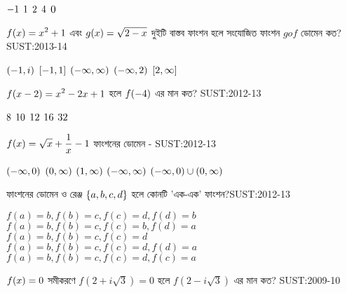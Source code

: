 \documentclass[addpoints]{exam}
\begin{document}
\begin{questions}
\begin{oneparchoices}
 \choice $\mathlarger{-1 }$
 \choice $\mathlarger{1}$
 \choice $\mathlarger{2}$
\choice $\mathlarger{4}$
\choice $\mathlarger{0}$
\end{oneparchoices}

\question $\mathlarger{f(x)= x^2 +1}$ এবং  $\mathlarger{g(x) = \sqrt{2-x}}$ দুইটি  বাস্তব  ফাংশন হলে সংযোজিত  ফাংশন  $gof$ ডোমেন কত?   \hfill \textsc{SUST:2013-14}

\begin{oneparchoices}
 \choice $\mathlarger{(-1,i)}$
 \choice $\mathlarger{[-1,1]}$
 \choice $\mathlarger{(-\infty, \infty)}$
\choice $\mathlarger{(-\infty, 2)}$
\choice $\mathlarger{[2,\infty]}$
\end{oneparchoices}

\question $\mathlarger{f(x-2)= x^2 -2x+1}$ হলে  $\mathlarger{f(-4)}$ এর মান  কত?   \hfill \textsc{SUST:2012-13}

\begin{oneparchoices}
 \choice $\mathlarger{8}$
 \choice $\mathlarger{10}$
 \choice $\mathlarger{12}$
\choice $\mathlarger{16}$
\choice $\mathlarger{32}$
\end{oneparchoices}

\question $\mathlarger{f(x)=\sqrt{x} +\frac{1}{x} -1}$ ফাংশনের ডোমেন -    \hfill \textsc{SUST:2012-13}

\begin{oneparchoices}
 \choice $\mathlarger{(-\infty, 0)}$
 \choice $\mathlarger{(0, \infty)}$
 \choice $\mathlarger{(1, \infty)}$
 \choice $\mathlarger{(-\infty, \infty)}$
 \choice $\mathlarger{(-\infty, 0)\cup (0, \infty)}$
\end{oneparchoices}

\question   ফাংশনের ডোমেন ও রেঞ্জ  $\mathlarger{\{a, b, c, d\}}$  হলে কোনটি 'এক-এক' ফাংশন?\hfill \textsc{SUST:2012-13}

\begin{oneparchoices}
 \choice $f(a)=b, f(b)=c, f(c)=d, f(d)=b$\\
 \choice $f(a)=b, f(b)=c, f(c)=b, f(d)=a$\\
 \choice $f(a)=b, f(b)=c, f(c)=d$\\
 \choice $f(a)=b, f(b)=c, f(c)=d, f(d)=a$\\
 \choice $f(a)=b, f(b)=c, f(c)=d, f(c)=a$
\end{oneparchoices}

\question $\mathlarger{f(x)=0}$ সমীকরণে $f(2+i\sqrt{3}) = 0$ হলে $f(2-i\sqrt{3})$ এর মান কত? \hfill \textsc{SUST:2009-10}


\end{questions}
\end{document}

